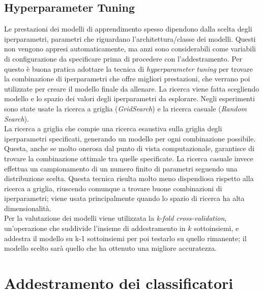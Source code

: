 \subsection{Hyperparameter Tuning}\label{subsec:tuning}
Le prestazioni dei modelli di apprendimento spesso dipendono dalla scelta degli iperparametri, parametri che riguardano l'architettura/classe dei modelli. Questi non vengono appresi automaticamente, ma anzi sono considerabili come variabili di configurazione da specificare prima di procedere con l'addestramento. Per questo è buona pratica adottare la tecnica di \textit{hyperparameter tuning} per trovare la combinazione di iperparametri che offre migliori prestazioni, che verrano poi utilizzate per creare il modello finale da allenare.
La ricerca viene fatta scegliendo modello e lo spazio dei valori degli iperparametri da esplorare. Negli esperimenti sono state usate la ricerca a griglia (\textit{GridSearch}) e la ricerca casuale (\textit{Random Search}).\\
La ricerca a griglia che compie una ricerca esaustiva sulla griglia degli iperparametri specificati, generando un modello per ogni combinazione possibile. Questa, anche se molto onerosa dal punto di vista computazionale, garantisce di trovare la combinazione ottimale tra quelle specificate.
La ricerca casuale invece effettua un campionamento di un numero finito di parametri seguendo una distribuzione scelta. Questa tecnica risulta molto meno dispendiosa rispetto alla ricerca a griglia, riuscendo comunque a trovare buone combinazioni di iperparametri; viene usata principalmente quando lo spazio di ricerca ha alta dimensionalità.\\
Per la valutazione dei modelli viene utilizzata la \textit{k-fold cross-validation}, un'operazione che suddivide l'insieme di addestramento in $k$ sottoinsiemi, e addestra il modello su k-1 sottoinsiemi per poi testarlo su quello rimanente; il modello scelto sarà quello che ha ottenuto una migliore accuratezza.
\section{Addestramento dei classificatori}
